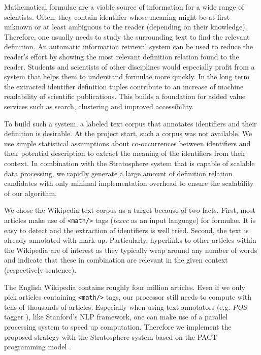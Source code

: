 \documentclass[runningheads]{llncs}
\begin{document}
Mathematical formulae are a viable source of information for a wide range of
scientists. Often, they contain identifier whose meaning might be at first
unknown or at least ambiguous to the reader (depending on their knowledge).
Therefore, one usually needs to study the surrounding text to find the
relevant definition. An automatic information retrieval system can be used to
reduce the reader's effort by showing the most relevant definition relation
found to the reader. Students and scientists of other disciplines would
especially profit from a system that helps them to understand formulae more
quickly. In the long term the extracted identifier definition tuples contribute
to an increase of machine readability of scientific publications. This builds a 
foundation for added value services such as search, clustering and improved
accessibility.


To build such a system, a labeled text corpus that annotates identifiers and
their definition is desirable. At the project start, such a corpus was not
available. We use simple statistical assumptions about co-occurrences between
identifiers and their potential description to extract the meaning of the
identifiers from their context. In combination with the Stratosphere system
that is capable of scalable data processing,  we rapidly generate a large
amount of definition relation candidates with only minimal implementation
overhead to ensure the scalability of our algorithm.


We chose the Wikipedia text corpus as a target because of two facts. First,
most articles make use of \texttt{<math/>} tags (\emph{texvc} as an input
language) for formulae. It is easy to detect and the extraction of identifiers
is well tried. Second, the text is already annotated with mark-up.
Particularly, hyperlinks to other articles within the Wikipedia are of
interest as they typically wrap around any number of words and indicate that
these in combination are relevant in the given context (respectively
sentence).


The English Wikipedia contains roughly four million articles. Even if we only
pick articles containing \texttt{<math/>} tags, our processor still needs to
compute with tens of thousands of articles. Especially when using text
annotators (e.g. \emph{POS} tagger \cite{Rathna96}), like Stanford's NLP
framework, one can make use of a parallel processing system to speed up
computation. Therefore we implement the proposed strategy with the
Stratosphere system based on the PACT programming model \cite{Alexandrov2010}.
\end{document}
